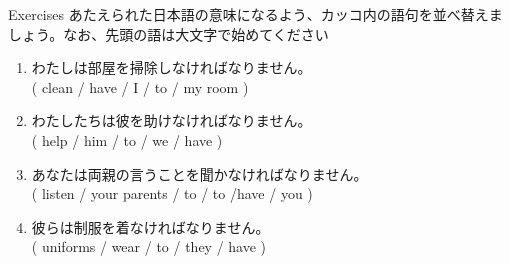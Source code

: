 \documentclass[aspectratio=169,xcolor={dvipsnames,table}]{beamer}
\newcommand{\myaudio}[1]{\href{#1}{\faVolumeUp}}
\begin{document}
\begin{frame}[plain]{Exercises}
あたえられた日本語の意味になるよう、カッコ内の語句を並べ替えましょう。なお、先頭の語は大文字で始めてください%
\hfill{\scriptsize \myaudio{./audio/014_have_to_02.mp3}}
\begin{enumerate}
 \item わたしは部屋を掃除しなければなりません。\\
( clean / have / I / to / my room )\hspace{20pt}
 \item わたしたちは彼を助けなければなりません。\\
( help / him / to / we / have )\hspace{20pt}
 \item あなたは両親の言うことを聞かなければなりません。\\
( listen / your parents / to / to /have / you )\\
 \item 彼らは制服を着なければなりません。
\\
( uniforms / wear / to / they / have )\hspace{20pt}
\\%
\hfill{}
\end{enumerate} 
\end{frame}
\end{document}
